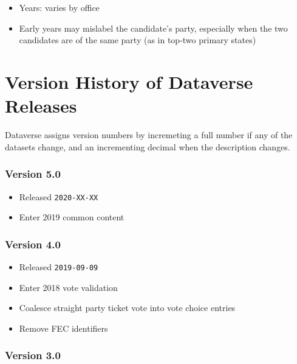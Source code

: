 \documentclass[10pt,article,oneside]{memoir}
\theoremstyle{definition}
\begin{document}
\begin{itemize}
\tightlist
\item
  Years: varies by office
\item
  Early years may mislabel the candidate's party, especially when the
  two candidates are of the same party (as in top-two primary states)
\end{itemize}

\newpage

\hypertarget{version-history-of-dataverse-releases}{%
\section{Version History of Dataverse
Releases}\label{version-history-of-dataverse-releases}}

Dataverse assigns version numbers by incremeting a full number if any of
the datasets change, and an incrementing decimal when the description
changes.

\hypertarget{version-5.0}{%
\subsubsection{Version 5.0}\label{version-5.0}}

\begin{itemize}
\tightlist
\item
  Released \texttt{2020-XX-XX}
\item
  Enter 2019 common content
\end{itemize}

\hypertarget{version-4.0}{%
\subsubsection{Version 4.0}\label{version-4.0}}

\begin{itemize}
\tightlist
\item
  Released \texttt{2019-09-09}
\item
  Enter 2018 vote validation
\item
  Coalesce straight party ticket vote into vote choice entries
\item
  Remove FEC identifiers
\end{itemize}

\hypertarget{version-3.0}{%
\subsubsection{Version 3.0}\label{version-3.0}}
\end{document}

